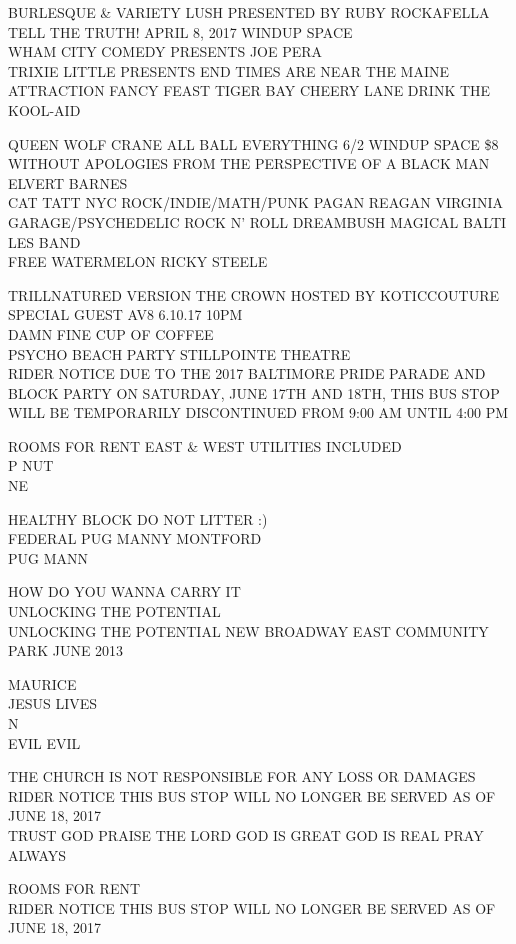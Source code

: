 \documentclass[10pt,letterpaper]{article}
\begin{document}
BURLESQUE \& VARIETY LUSH PRESENTED BY RUBY ROCKAFELLA\\
TELL THE TRUTH! APRIL 8, 2017 WINDUP SPACE\\
WHAM CITY COMEDY PRESENTS JOE PERA\\
TRIXIE LITTLE PRESENTS END TIMES ARE NEAR THE MAINE ATTRACTION FANCY FEAST TIGER BAY CHEERY LANE DRINK THE KOOL{-}AID

QUEEN WOLF CRANE ALL BALL EVERYTHING 6/2 WINDUP SPACE \$8\\
WITHOUT APOLOGIES FROM THE PERSPECTIVE OF A BLACK MAN ELVERT BARNES\\
CAT TATT NYC ROCK/INDIE/MATH/PUNK PAGAN REAGAN VIRGINIA GARAGE/PSYCHEDELIC ROCK N' ROLL DREAMBUSH MAGICAL BALTI LES BAND\\
FREE WATERMELON RICKY STEELE

TRILLNATURED VERSION THE CROWN HOSTED BY KOTICCOUTURE SPECIAL GUEST AV8 6.10.17 10PM\\
DAMN FINE CUP OF COFFEE\\
PSYCHO BEACH PARTY STILLPOINTE THEATRE\\
RIDER NOTICE DUE TO THE 2017 BALTIMORE PRIDE PARADE AND BLOCK PARTY ON SATURDAY, JUNE 17TH AND 18TH, THIS BUS STOP WILL BE TEMPORARILY DISCONTINUED FROM 9:00 AM UNTIL 4:00 PM

ROOMS FOR RENT EAST \& WEST UTILITIES INCLUDED\\
P NUT\\
NE

HEALTHY BLOCK DO NOT LITTER :)\\
FEDERAL PUG MANNY MONTFORD\\
PUG MANN

HOW DO YOU WANNA CARRY IT\\
UNLOCKING THE POTENTIAL\\
UNLOCKING THE POTENTIAL NEW BROADWAY EAST COMMUNITY PARK JUNE 2013

MAURICE\\
JESUS LIVES\\
N\\
EVIL EVIL

THE CHURCH IS NOT RESPONSIBLE FOR ANY LOSS OR DAMAGES\\
RIDER NOTICE THIS BUS STOP WILL NO LONGER BE SERVED AS OF JUNE 18, 2017\\
TRUST GOD PRAISE THE LORD GOD IS GREAT GOD IS REAL PRAY ALWAYS

ROOMS FOR RENT\\
RIDER NOTICE THIS BUS STOP WILL NO LONGER BE SERVED AS OF JUNE 18, 2017
\end{document}
